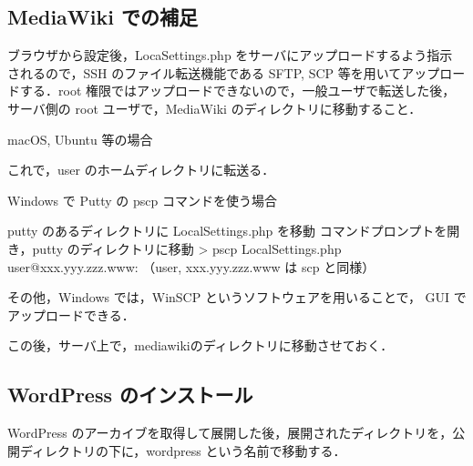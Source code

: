 \subsection*{MediaWiki での補足}

ブラウザから設定後，LocaSettings.php をサーバにアップロードするよう指示
されるので，SSH のファイル転送機能である SFTP, SCP 等を用いてアップロー
ドする．root 権限ではアップロードできないので，一般ユーザで転送した後，
サーバ側の root ユーザで，MediaWiki のディレクトリに移動すること．

macOS, Ubuntu 等の場合
これで，user のホームディレクトリに転送る．

Windows で Putty の pscp コマンドを使う場合
\begin{cli}
putty のあるディレクトリに LocalSettings.php を移動
コマンドプロンプトを開き，putty のディレクトリに移動
> pscp LocalSettings.php user@xxx.yyy.zzz.www:
（user, xxx.yyy.zzz.www は scp と同様）
\end{cli}
その他，Windows では，WinSCP というソフトウェアを用いることで，
GUI でアップロードできる．

この後，サーバ上で，mediawikiのディレクトリに移動させておく．

\subsection{WordPress のインストール}
WordPress のアーカイブを取得して展開した後，展開されたディレクトリを，公開ディレクトリの下に，wordpress という名前で移動する．

